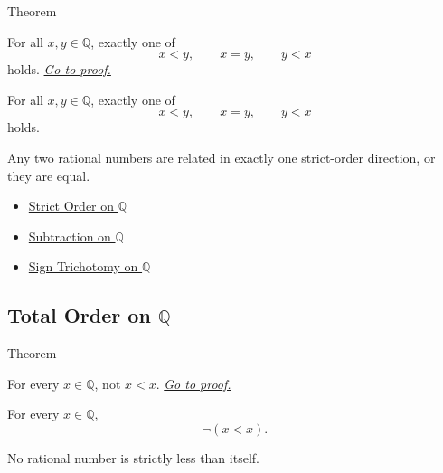 \begin{theorembox}{Theorem}
\begin{theorem}
\label{thm:trichotomy-on-q}
For all $x,y\in\mathbb{Q}$, exactly one of
\[
x<y,\qquad x=y,\qquad y<x
\]
holds.
\hyperref[prf:trichotomy-on-q]{\textit{Go to proof.}}
\end{theorem}
\end{theorembox}

\begin{remark*}
For all $x,y\in\mathbb{Q}$, exactly one of
\[
x<y,\qquad x=y,\qquad y<x
\]
holds.
\end{remark*}

\begin{remark*}[Interpretation]
Any two rational numbers are related in exactly one strict-order direction, or
they are equal.
\end{remark*}

\begin{dependencies}
\begin{itemize}
  \item \hyperref[def:strict-order-on-q]{Strict Order on $\mathbb{Q}$}
  \item \hyperref[def:subtraction-on-q]{Subtraction on $\mathbb{Q}$}
  \item \hyperref[thm:sign-trichotomy-on-q]{Sign Trichotomy on $\mathbb{Q}$}
\end{itemize}
\end{dependencies}

\subsection*{\texorpdfstring{Total Order on $\mathbb{Q}$}{Total Order on Q}}

\begin{theorembox}{Theorem}
\begin{theorem}
\label{thm:strict-order-on-q-irreflexive}
For every $x\in\mathbb{Q}$, not $x<x$.
\hyperref[prf:strict-order-on-q-irreflexive]{\textit{Go to proof.}}
\end{theorem}
\end{theorembox}

\begin{remark*}
For every $x\in\mathbb{Q}$,
\[
\neg(x<x).
\]
\end{remark*}

\begin{remark*}[Interpretation]
No rational number is strictly less than itself.
\end{remark*}

